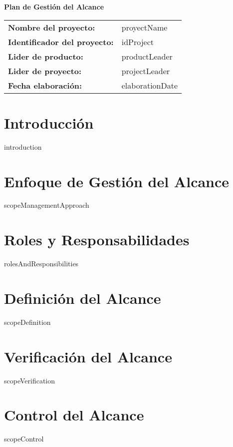\documentclass{article}
\begin{document}
    \begin{center}
    {\huge\textbf{Plan de Gestión del Alcance}}\\[14cm]
    \end{center}

    \newcommand{\wrappingmulticolumn}[3]
    {\multicolumn{#1}
    {|>{\hsize=\dimexpr#1\hsize+\tabcolsep * (2 * (#1 - 1) )+\arrayrulewidth* (#1 - 2)\relax}#2|}
    {#3}}
    \renewcommand{\arraystretch}{1.5} %

    \begin{tabularx}{\textwidth}{|>{\raggedright\arraybackslash}p{4cm}|>{\raggedright\arraybackslash}X|} \hline
    \rowcolor{gray!10}\textbf{Nombre del proyecto:} & {{proyectName}} \\[0.3cm]
    \textbf{Identificador del proyecto:} & {{idProject}} \\[0.3cm]
    \textbf{Lider de producto:} & {{productLeader}} \\[0.3cm]
    \textbf{Lider de proyecto:} & {{projectLeader}} \\[0.3cm]
    \textbf{Fecha elaboración:} & {{elaborationDate}} \\ \hline
    \end{tabularx}

    \newpage

    \tableofcontents
    \newpage

    \section{Introducción}
    {{introduction}}

    \section{Enfoque de Gestión del Alcance}
    {{scopeManagementApproach}}
    
    \section{Roles y Responsabilidades}
    {{rolesAndResponsibilities}}

    \section{Definición del Alcance}
    {{scopeDefinition}}

    \section{Verificación del Alcance}
    {{scopeVerification}}

    \section{Control del Alcance}
    {{scopeControl}}
\end{document}
